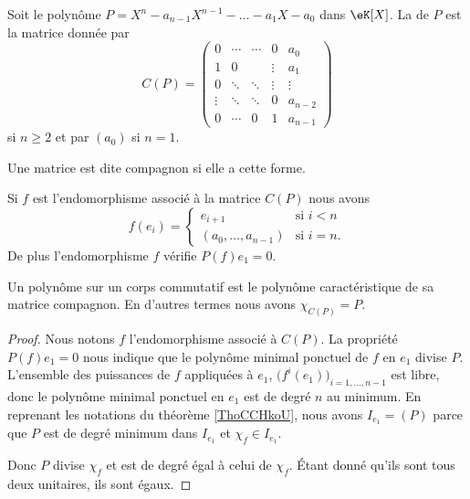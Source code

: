 \begin{definition}      \label{DEFooOSVAooGevsda}
    Soit le polynôme \( P=X^n-a_{n-1}X^{n-1}-\ldots-a_1X-a_0\) dans \( \eK[X]\). La  de \( P\) est la matrice donnée par
    \begin{equation}
        C(P)=\begin{pmatrix}
            0    &   \cdots    &   \cdots    &   0    &   a_0\\  
            1    &   0    &       &   \vdots    &   a_1\\  
            0    &   \ddots    &   \ddots    &   \vdots    &   \vdots\\  
            \vdots    &   \ddots    &   \ddots    &   0    &   a_{n-2}\\  
            0    &   \cdots    &   0    &   1    &   a_{n-1}    
        \end{pmatrix}
    \end{equation}
    si \( n\geq 2\) et par \( (a_0)\) si \( n=1\). 

    Une matrice est dite compagnon si elle a cette forme.
\end{definition}

\begin{proposition}
    Si \( f\) est l'endomorphisme associé à la matrice \( C(P)\) nous avons
    \begin{equation}
        f(e_i)=\begin{cases}
            e_{i+1}    &   \text{si } i<n\\
            (a_0,\ldots, a_{n-1})    &    \text{si } i=n.
        \end{cases}
    \end{equation}
    De plus l'endomorphisme \( f\) vérifie \( P(f)e_1=0\).
\end{proposition}

\begin{lemma} \label{LemkVNisk}
    Un polynôme sur un corps commutatif est le polynôme caractéristique de sa matrice compagnon. En d'autres termes nous avons \( \chi_{C(P)}=P\).
\end{lemma}

\begin{proof}
    Nous notons \( f\) l'endomorphisme associé à \( C(P)\). La propriété \( P(f)e_1=0\) nous indique que le polynôme minimal ponctuel de \( f\) en \( e_1\) divise \( P\). L'ensemble des puissances de \( f\) appliquées à \( e_1\), \( \big( f^i(e_1) \big)_{i=1,\ldots, n-1}\) est libre, donc le polynôme minimal ponctuel en \( e_1\) est de degré \( n\) au minimum. En reprenant les notations du théorème \ref{ThoCCHkoU}, nous avons \( I_{e_1}=(P)\) parce que \( P\) est de degré minimum dans \( I_{e_1}\) et \( \chi_f\in I_{e_1}\).

    Donc \( P\) divise \( \chi_f\) et est de degré égal à celui de \( \chi_f\). Étant donné qu'ils sont tous deux unitaires, ils sont égaux.
\end{proof}

